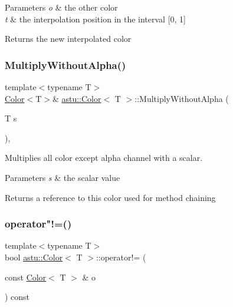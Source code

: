 \begin{DoxyParams}{Parameters}
{\em o} & the other color \\
\hline
{\em t} & the interpolation position in the interval \mbox{[}0, 1\mbox{]} \\
\hline
\end{DoxyParams}
\begin{DoxyReturn}{Returns}
the new interpolated color 
\end{DoxyReturn}
\mbox{\label{classastu_1_1Color_a662946707019ddc5d79612da685be5f8}} 
\subsubsection{\texorpdfstring{Multiply\+Without\+Alpha()}{MultiplyWithoutAlpha()}}
{\footnotesize\ttfamily template$<$typename T$>$ \\
\hyperlink{classastu_1_1Color}{Color}$<$T$>$\& \hyperlink{classastu_1_1Color}{astu\+::\+Color}$<$ T $>$\+::Multiply\+Without\+Alpha (\begin{DoxyParamCaption}\item[{T}]{s }\end{DoxyParamCaption})\hspace{0.3cm}{\ttfamily [inline]}, {\ttfamily [noexcept]}}

Multiplies all color except alpha channel with a scalar.


\begin{DoxyParams}{Parameters}
{\em s} & the scalar value \\
\hline
\end{DoxyParams}
\begin{DoxyReturn}{Returns}
a reference to this color used for method chaining 
\end{DoxyReturn}
\mbox{\label{classastu_1_1Color_a03214300c75b0737cd91679f758112c5}} 
\subsubsection{\texorpdfstring{operator"!=()}{operator!=()}}
{\footnotesize\ttfamily template$<$typename T$>$ \\
bool \hyperlink{classastu_1_1Color}{astu\+::\+Color}$<$ T $>$\+::operator!= (\begin{DoxyParamCaption}\item[{const \hyperlink{classastu_1_1Color}{Color}$<$ T $>$ \&}]{o }\end{DoxyParamCaption}) const\hspace{0.3cm}{\ttfamily [inline]}}

